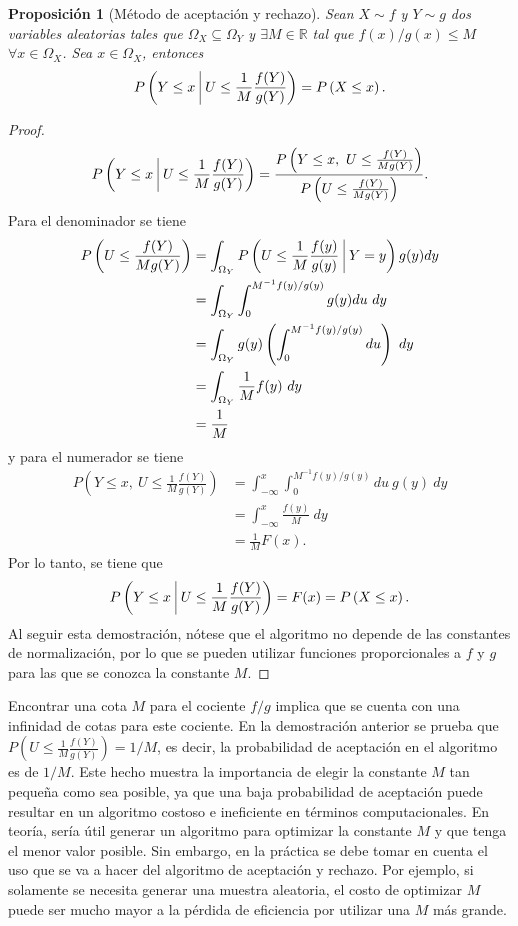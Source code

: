 \documentclass[11pt,a4paper]{article}
\newtheorem{proposition}{Proposición}[subsection]
\begin{document}
\begin{proposition}[Método de aceptación y rechazo] Sean $X\sim f$ y $Y \sim g$ dos variables aleatorias tales que $\Omega_X \subseteq \Omega_Y$ y $\exists M \in \mathbb{R}$ tal que $f(x)/g(x) \leq M$ $\forall x \in \Omega_X$. Sea $x \in \Omega_X$, entonces $$P\left( Y \leq x \  \vline \ U\leq \frac{1}{M}\frac{f(Y)}{g(Y)}\right) = P\left(X\leq x\right).$$
\end{proposition}
\begin{proof}
$$P\left( Y \leq x \  \vline \ U\leq \frac{1}{M}\frac{f(Y)}{g(Y)}\right) = \frac{P\left( Y\leq x, \ U \leq \frac{f(Y)}{Mg(Y)}\right)}{P\left( U \leq \frac{f(Y)}{Mg(Y)}\right)}.$$ Para el denominador se tiene 
\begin{align*}
P\left( U \leq \frac{f(Y)}{Mg(Y)}\right) &= \int_{\Omega_Y}P\left( U \leq \frac{1}{M}\frac{f(y)}{g(y)} \ \vline \ Y=y\right) g(y) dy\\
&= \int_{\Omega_Y}\int_0^{M^{-1} f(y)/g(y)} g(y)du \ dy\\
&= \int_{\Omega_Y}g(y)\left(\int_0^{M^{-1} f(y)/g(y)} du\right)\ dy\\
&= \int_{\Omega_Y}\frac{1}{M}f(y) \ dy\\
&= \frac{1}{M}
\end{align*}
y para el numerador se tiene
\begin{align*}
P\left( Y \leq x, \ U \leq \frac{1}{M}\frac{f(Y)}{g(Y)}\right) &= \int_{-\infty}^x\int_0^{M^{-1} f(y)/g(y)} du \ g(y) \ dy\\
&= \int_{-\infty}^x \frac{f(y)}{M} \ dy\\
&= \frac{1}{M} F(x).
\end{align*}
Por lo tanto, se tiene que $$P\left( Y \leq x \  \vline \ U\leq \frac{1}{M}\frac{f(Y)}{g(Y)}\right) = F(x) = P\left(X \leq x\right).$$
Al seguir esta demostración, nótese que el algoritmo no depende de las constantes de normalización, por lo que se pueden utilizar funciones proporcionales a $f$ y $g$ para las que se conozca la constante $M$.
\end{proof}

Encontrar una cota $M$ para el cociente $f/g$ implica que se cuenta con una infinidad de cotas para este cociente. En la demostración anterior se prueba que $P\left( U \leq \frac{1}{M}\frac{f(Y)}{g(Y)}\right) = 1/M$, es decir, la probabilidad de aceptación en el algoritmo es de $1/M$. Este hecho muestra la importancia de elegir la constante $M$ tan pequeña como sea posible, ya que una baja probabilidad de aceptación puede resultar en un algoritmo costoso e ineficiente en términos computacionales. En teoría, sería útil generar un algoritmo para optimizar la constante $M$ y que tenga el menor valor posible. Sin embargo, en la práctica se debe tomar en cuenta el uso que se va a hacer del algoritmo de aceptación y rechazo. Por ejemplo, si solamente se necesita generar una muestra aleatoria, el costo de optimizar $M$ puede ser mucho mayor a la pérdida de eficiencia por utilizar una $M$ más grande.
\end{document}
